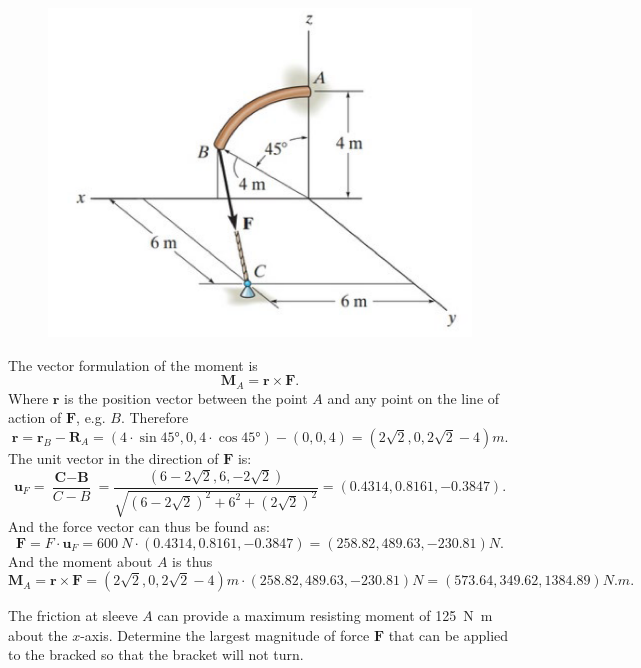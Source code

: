 \documentclass[a4paper]{article}
\begin{document}
\begin{figure} [ht]
  \centering
  \includegraphics[width=0.35\linewidth]{../figures/P2_1.png}
\end{figure}
\bigbreak
The vector formulation of the moment is
\[ 
  \textbf{M}_A = \textbf{r} \times \textbf{F}
.\]
Where $\textbf{r}$ is the position vector between the point $A$ and any point on the line of action of $\textbf{F}$, e.g. $B$. Therefore
\[ 
  \textbf{r} = \textbf{r}_B - \textbf{R}_A = \left( 4 \cdot \sin \ang{45}, 0, 4 \cdot \cos \ang{45} \right) - \left( 0, 0, 4 \right) = \left( 2 \sqrt{2}, 0, 2 \sqrt{2} -4 \right) \unit{m}
.\]
The unit vector in the direction of $\textbf{F}$ is:
\[ 
  \textbf{u}_{F} = \frac{\textbf{C} - \textbf{B}}{C - B} = \frac{\left( 6 - 2 \sqrt{2}, 6, -2 \sqrt{2} \right)}{\sqrt{\left( 6 - 2 \sqrt{2} \right)^2 + 6^2 + \left( 2 \sqrt{2} \right)^2}} = \left( \num{0,4314}, \num{0,8161}, \num{-0,3847} \right)
.\]
And the force vector can thus be found as:
\[ 
  \textbf{F} = F \cdot \textbf{u}_F = \qty{600}{N} \cdot \left( \num{0,4314}, \num{0,8161}, \num{-0,3847}  \right) = \left( \num{258,82}, \num{489,63}, - \num{230,81} \right) \unit{N}
.\]
And the moment about $A$ is thus
\[ 
  \textbf{M}_A = \textbf{r} \times \textbf{F} = \left( 2 \sqrt{2}, 0, 2 \sqrt{2} - 4 \right) \unit{m} \cdot \left( \num{258,82}, \num{489,63}, - \num{230,81}   \right) \unit{N} = \left( \num{573,64}, \num{349,62}, \num{1384,89}  \right) \unit{N.m} 
.\]


The friction at sleeve $A$ can provide a maximum resisting moment of \qty{125}{N.m} about the $x$-axis. Determine the largest magnitude of force $\textbf{F}$ that can be applied to the bracked so that the bracket will not turn.
\end{document}
